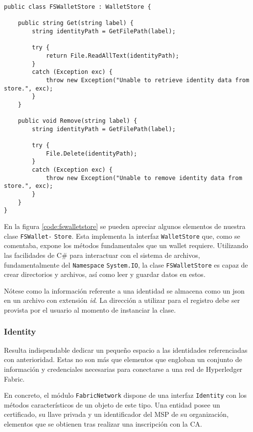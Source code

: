 \begin{lstlisting}[caption={Elementos de la clase \texttt{FSWalletStore}.}, label={code:fswalletstore}]
public class FSWalletStore : WalletStore {

	public string Get(string label) {
		string identityPath = GetFilePath(label);

		try {
			return File.ReadAllText(identityPath);
		}
		catch (Exception exc) {
			throw new Exception("Unable to retrieve identity data from store.", exc);
		}
	}

	public void Remove(string label) {
		string identityPath = GetFilePath(label);

		try {
			File.Delete(identityPath);
		}
		catch (Exception exc) {
			throw new Exception("Unable to remove identity data from store.", exc);
		}
	}
}
\end{lstlisting}

En la figura \ref{code:fswalletstore} se pueden apreciar algunos elementos de nuestra clase \texttt{FSWallet-} \texttt{Store}. Esta implementa la interfaz \texttt{WalletStore} que, como se comentaba, expone los m\'etodos fundamentales que un wallet requiere. Utilizando las facilidades de C\# para interactuar con el sistema de archivos, fundamentalmente del \texttt{Namespace}
\texttt{System.IO}, la clase \texttt{FSWalletStore} es capaz de crear directorios y archivos, as\'i como leer y guardar datos en estos. 

N\'otese como la informaci\'on referente a una identidad se almacena como un json en un archivo con extensi\'on \emph{id}. La direcci\'on a utilizar para el registro debe ser provista por el usuario al momento de instanciar la clase.

\subsubsection{Identity}

Resulta indispendable dedicar un peque\~no espacio a las identidades referenciadas con anterioridad. Estas no son m\'as que elementos que engloban un conjunto de información y credenciales necesarias para conectarse a una red de Hyperledger Fabric.

En concreto, el m\'odulo \texttt{FabricNetwork} dispone de una interfaz \texttt{Identity} con los m\'etodos caracter\'isticos de un objeto de este tipo. Una entidad posee un certificado, su llave privada y un identificador del MSP de su organizaci\'on, elementos que se obtienen tras realizar una inscripci\'on con la CA.

